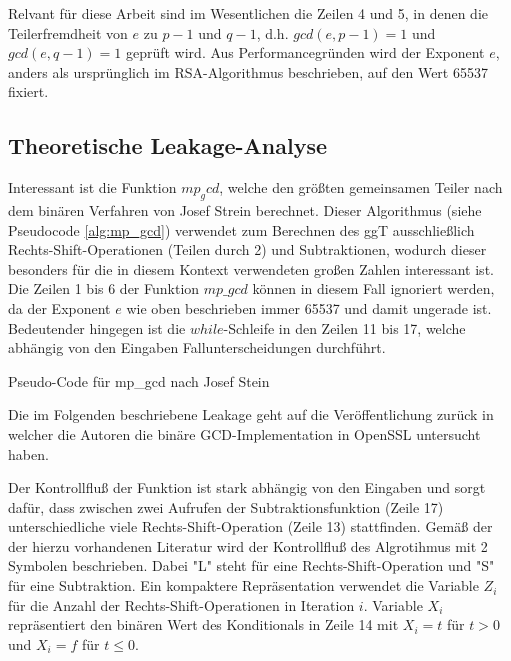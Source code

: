 Relvant für diese Arbeit sind im Wesentlichen die Zeilen 4 und 5, in denen die Teilerfremdheit von $e$ zu $p-1$ und $q-1$, d.h. $gcd(e,p-1) = 1$ und $gcd(e,q-1) = 1$ geprüft wird.
Aus Performancegründen wird der Exponent $e$, anders als ursprünglich im RSA-Algorithmus beschrieben, auf den Wert 65537 fixiert.

\subsection{Theoretische Leakage-Analyse}

Interessant ist die Funktion $mp_gcd$, welche den größten gemeinsamen Teiler nach dem binären Verfahren von Josef Strein \cite{SteinBinaryGCD} berechnet. 
Dieser Algorithmus (siehe Pseudocode \ref{alg:mp_gcd}) verwendet zum Berechnen des ggT ausschließlich Rechts-Shift-Operationen (Teilen durch 2) und Subtraktionen, wodurch dieser besonders für die in diesem Kontext verwendeten großen Zahlen interessant ist.
Die Zeilen 1 bis 6 der Funktion $mp\_gcd$ können in diesem Fall ignoriert werden, da der Exponent $e$ wie oben beschrieben immer 65537 und damit ungerade ist. 
Bedeutender hingegen ist die $while$-Schleife in den Zeilen 11 bis 17, welche abhängig von den Eingaben Fallunterscheidungen durchführt. 

\begin{algorithm}[h]
\DontPrintSemicolon
\caption{Pseudo-Code für mp_gcd nach Josef Stein}
\label{alg:mp_gcd}

\end{algorithm}

Die im Folgenden beschriebene Leakage geht auf die Veröffentlichung \cite{RSAKeyGeneration2} zurück in welcher die Autoren die binäre GCD-Implementation in OpenSSL untersucht haben.

Der Kontrollfluß der Funktion ist stark abhängig von den Eingaben und sorgt dafür, dass zwischen zwei Aufrufen der Subtraktionsfunktion (Zeile 17) unterschiedliche viele Rechts-Shift-Operation (Zeile 13) stattfinden.
Gemäß der der hierzu vorhandenen Literatur wird der Kontrollfluß des Algrotihmus mit 2 Symbolen beschrieben.
Dabei "L" steht für eine Rechts-Shift-Operation und "S" für eine Subtraktion.
Ein kompaktere Repräsentation verwendet die Variable $Z_i$ für die Anzahl der Rechts-Shift-Operationen in Iteration $i$.
Variable $X_i$ repräsentiert den binären Wert des Konditionals in Zeile 14 mit $X_i=t$ für $t>0$ und $X_i = f$ für $t \leq 0$.

